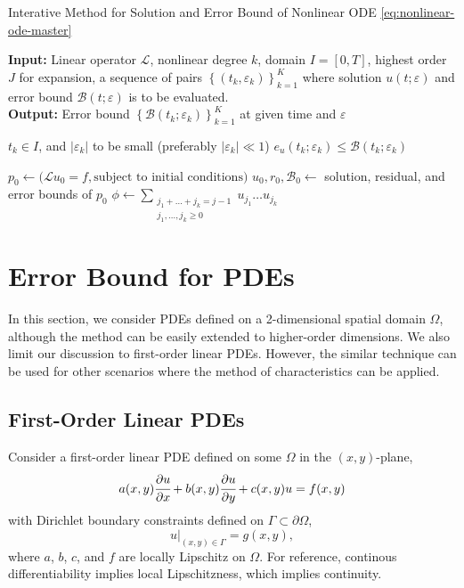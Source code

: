\documentclass[accepted]{uai2023}
\newcommand{\px}[1]{\cfrac{\partial #1}{\partial x}}
\newcommand{\py}[1]{\cfrac{\partial #1}{\partial y}}
\newcommand{\Err}{e}
\newcommand{\Bound}{\mathcal{B}}
\renewcommand{\L}{\mathcal{L}}
\begin{document}
    \begin{algorithm}
        \small
        \caption{Interative Method for Solution and Error Bound of Nonlinear ODE \ref{eq:nonlinear-ode-master}} \label{alg:nonlinear-iterative}
        \textbf{Input:} Linear operator $\L$, nonlinear degree $k$, domain $I=[0, T]$, highest order $J$ for expansion, a sequence of pairs $\left\{(t_k, \varepsilon_k)\right\}_{k=1}^{K}$ where solution $u(t; \varepsilon)$ and error bound $\Bound(t; \varepsilon)$ is to be evaluated. \\
        \textbf{Output:} Error bound $\left\{\Bound(t_k; \varepsilon_k)\right\}_{k=1}^{K}$ at given time and $\varepsilon$
        \begin{algorithmic}
            \Require $t_k \in I$, and $|\varepsilon_k|$ to be small (preferably $|\varepsilon_k| \ll 1$)
            \Ensure $\Err_{u}(t_k; \varepsilon_k) \leq \Bound(t_k; \varepsilon_k)$ 
            \hspace{0.5pt}
            
            \State $p_0 \gets \big(\L u_0 = f, \text{subject to initial conditions}\big)$
            \State $u_0, r_0, \Bound_0 \gets$ solution, residual, and error bounds of $p_0$
                \State $\phi \gets \sum\limits_{\substack{j_1+\dots+j_k = j - 1\\j_1, \dots, j_k \geq 0}}u_{j_1}\dots u_{j_k}$
            \EndFor
        \end{algorithmic}
    \end{algorithm}

\section{Error Bound for PDEs}
    In this section, we consider PDEs defined on a 2-dimensional spatial domain $\Omega$, although the method can be easily extended to higher-order dimensions. We also limit our discussion to first-order linear PDEs. However, the similar technique can be used for other scenarios where the method of characteristics can be applied.

\subsection{First-Order Linear PDEs}
    Consider a first-order linear PDE defined on some $\Omega$ in the $(x, y)$-plane,
    \begin{equation}\label{eq:pde-master}
        a(x, y) \px{u} + b(x, y) \py{u} + c(x, y)u = f(x, y)
    \end{equation}
    with Dirichlet boundary constraints defined on $\Gamma \subset \partial \Omega$,
    \begin{equation}\label{eq:pde-bc-master}
        u\Big|_{(x, y) \in \Gamma} = g(x, y),
    \end{equation}
    where $a$, $b$, $c$, and $f$ are locally Lipschitz on $\Omega$. For reference, continous differentiability implies local Lipschitzness, which implies continuity.
\end{document}
